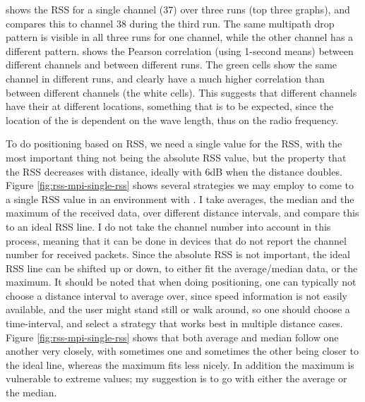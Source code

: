  shows the RSS for a single channel (37) over three runs (top three graphs), and compares this to channel 38 during the third run.
The same multipath drop pattern is visible in all three runs for one channel, while the other channel has a different pattern.
 shows the Pearson correlation (using 1-second means) between different channels and between different runs.
The green cells show the same channel in different runs, and clearly have a much higher correlation than between different channels (the white cells).
This suggests that different channels have their \mpids at different locations, something that is to be expected, since the location of the \mpids is dependent on the wave length, thus on the radio frequency.


To do positioning based on RSS, we need a single value for the RSS, with the most important thing not being the absolute RSS value, but the property that the RSS decreases with distance, ideally with 6dB when the distance doubles.
Figure \ref{fig:rss-mpi-single-rss} shows several strategies we may employ to come to a single RSS value in an environment with \mpi.
I take averages, the median and the maximum of the received data, over different distance intervals, and compare this to an ideal RSS line.
I do not take the channel number into account in this process, meaning that it can be done in devices that do not report the channel number for received packets.
Since the absolute RSS is not important, the ideal RSS line can be shifted up or down, to either fit the average/median data, or the maximum.
It should be noted that when doing positioning, one can typically not choose a distance interval to average over, since speed information is not easily available, and the user might stand still or walk around, so one should choose a time-interval, and select a strategy that works best in multiple distance cases.
Figure \ref{fig:rss-mpi-single-rss} shows that both average and median follow one another very closely, with sometimes one and sometimes the other being closer to the ideal line, whereas the maximum fits less nicely.
In addition the maximum is vulnerable to extreme values; my suggestion is to go with either the average or the median.


